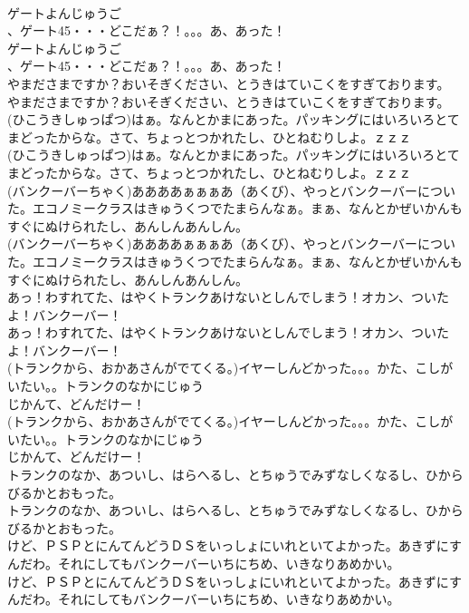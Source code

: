\documentclass[8pt]{extreport}
\begin{document}
\begin{CJK}{UTF8}{min}
\\	ゲートよんじゅうご
\\	、ゲート45・・・どこだぁ？！。。。あ、あった！
\\	ゲートよんじゅうご
\\	、ゲート45・・・どこだぁ？！。。。あ、あった！
\\	やまださまですか？おいそぎください、とうきはていこくをすぎております。
\\	やまださまですか？おいそぎください、とうきはていこくをすぎております。
\\	(ひこうきしゅっぱつ)はぁ。なんとかまにあった。パッキングにはいろいろとてまどったからな。さて、ちょっとつかれたし、ひとねむりしよ。ｚｚｚ
\\	(ひこうきしゅっぱつ)はぁ。なんとかまにあった。パッキングにはいろいろとてまどったからな。さて、ちょっとつかれたし、ひとねむりしよ。ｚｚｚ
\\	(バンクーバーちゃく)ああああぁぁぁあ（あくび）、やっとバンクーバーについた。エコノミークラスはきゅうくつでたまらんなぁ。まぁ、なんとかぜいかんもすぐにぬけられたし、あんしんあんしん。
\\	(バンクーバーちゃく)ああああぁぁぁあ（あくび）、やっとバンクーバーについた。エコノミークラスはきゅうくつでたまらんなぁ。まぁ、なんとかぜいかんもすぐにぬけられたし、あんしんあんしん。
\\	あっ！わすれてた、はやくトランクあけないとしんでしまう！オカン、ついたよ！バンクーバー！
\\	あっ！わすれてた、はやくトランクあけないとしんでしまう！オカン、ついたよ！バンクーバー！
\\	(トランクから、おかあさんがでてくる。)イヤーしんどかった。。。かた、こしがいたい。。トランクのなかにじゅう
\\	じかんて、どんだけー！
\\	(トランクから、おかあさんがでてくる。)イヤーしんどかった。。。かた、こしがいたい。。トランクのなかにじゅう
\\	じかんて、どんだけー！
\\	トランクのなか、あついし、はらへるし、とちゅうでみずなしくなるし、ひからびるかとおもった。
\\	トランクのなか、あついし、はらへるし、とちゅうでみずなしくなるし、ひからびるかとおもった。
\\	けど、ＰＳＰとにんてんどうＤＳをいっしょにいれといてよかった。あきずにすんだわ。それにしてもバンクーバーいちにちめ、いきなりあめかい。
\\	けど、ＰＳＰとにんてんどうＤＳをいっしょにいれといてよかった。あきずにすんだわ。それにしてもバンクーバーいちにちめ、いきなりあめかい。

\end{CJK}
\end{document}
